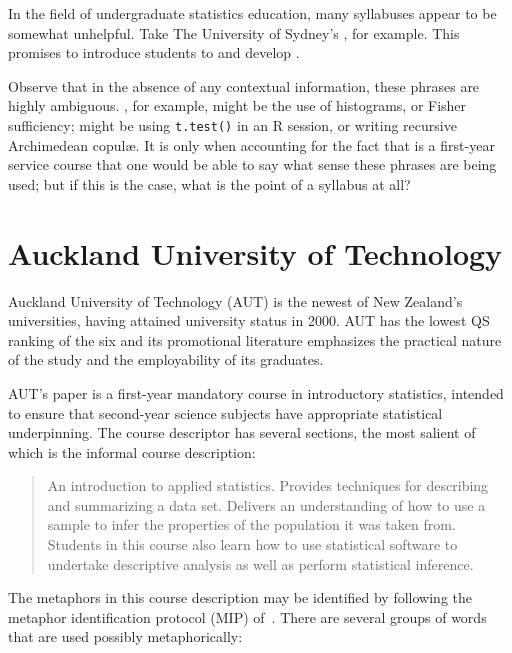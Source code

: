 In the field of undergraduate statistics education, many syllabuses
appear to be somewhat unhelpful.  Take The University of Sydney's
, for example.  This promises to introduce students to
 and develop
.

Observe that in the absence of any contextual information, these
phrases are highly ambiguous.  ,
for example, might be the use of histograms, or Fisher sufficiency;
 might be using
\texttt{t.test()} in an R session, or writing recursive Archimedean
copul\ae.  It is only when accounting for the fact that
 is a first-year service course that one would be able
to say what sense these phrases are being used; but if this is the
case, what is the point of a syllabus at all?

\section{Auckland University of Technology}

Auckland University of Technology (AUT) is the newest of New Zealand's
universities, having attained university status in 2000.  AUT has the
lowest QS ranking of the six and its promotional literature emphasizes
the practical nature of the study and the employability of its
graduates.

AUT's  paper is a first-year mandatory course in
introductory statistics, intended to ensure that second-year science
subjects have appropriate statistical underpinning.  The course
descriptor has several sections, the most salient of which is the
informal course description: 

\begin{singlespace}
\begin{quote}
  An introduction to applied statistics.  Provides techniques for
  describing and summarizing a data set.  Delivers an understanding of
  how to use a sample to infer the properties of the population it was
  taken from.  Students in this course also learn how to use
  statistical software to undertake descriptive analysis as well as
  perform statistical inference.
\end{quote}
\end{singlespace}

The metaphors in this course description may be identified by
following the metaphor identification protocol (MIP)
of~.  There are several groups of words that
are used possibly metaphorically:

